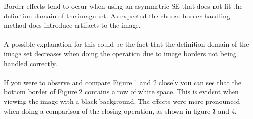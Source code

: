 \documentclass{article}
\begin{document}
\begin{flushleft}
Border effects tend to occur when using an asymmetric SE that does not fit the definition domain of the image set.
As expected the chosen border handling method does introduce artifacts to the image.\\ \\
A possible explanation for this could be the fact that the definition domain of the image set decreases when doing the operation due to image borders not being handled correctly.\\ \\
If you were to observe and compare Figure 1 and 2 closely you can see that the bottom border of Figure 2 contains a row of white space. This is evident when viewing the image with a black background. The effects were more pronounced when doing a comparison of the closing operation, as shown in figure 3 and 4.
\end{flushleft}
\end{document}
